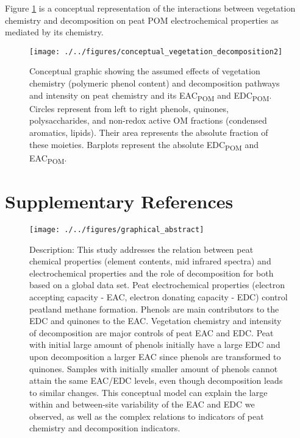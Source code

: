 \documentclass[alpha-refs]{wiley-article-rmd}
\begin{document}
\begin{refsection}
\clearpage

Figure \ref{fig:conceptual2} is a conceptual representation of the interactions between vegetation chemistry and decomposition on peat POM electrochemical properties as mediated by its chemistry.

\begin{figure}[H]

{\centering \texttt{[image: ./../figures/conceptual\_vegetation\_decomposition2]}

}

\caption{Conceptual graphic showing the assumed effects of vegetation chemistry (polymeric phenol content) and decomposition pathways and intensity on peat chemistry and its EAC\textsubscript{POM} and EDC\textsubscript{POM}. Circles represent from left to right phenols, quinones, polysaccharides, and non-redox active OM fractions (condensed aromatics, lipids). Their area represents the absolute fraction of these moieties. Barplots represent the absolute EDC\textsubscript{POM} and EAC\textsubscript{POM}.}\label{fig:conceptual2}
\end{figure}

\hypertarget{supplementary-references}{%
\section*{Supplementary References}\label{supplementary-references}}

\printbibliography[heading=none]

\end{refsection}

\clearpage

\begin{figure}[H]

{\centering \texttt{[image: ./../figures/graphical\_abstract]}

}

\caption{Description: This study addresses the relation between peat chemical properties (element contents, mid infrared spectra) and electrochemical properties and the role of decomposition for both based on a global data set. Peat electrochemical properties (electron accepting capacity - EAC, electron donating capacity - EDC) control peatland methane formation. Phenols are main contributors to the EDC and quinones to the EAC. Vegetation chemistry and intensity of decomposition are major controls of peat EAC and EDC. Peat with initial large amount of phenols initially have a large EDC and upon decomposition a larger EAC since phenols are transformed to quinones. Samples with initially smaller amount of phenols cannot attain the same EAC/EDC levels, even though decomposition leads to similar changes. This conceptual model can explain the large within and between-site variability of the EAC and EDC we observed, as well as the complex relations to indicators of peat chemistry and decomposition indicators.}\label{fig:graphical-abstract}
\end{figure}

\end{document}
